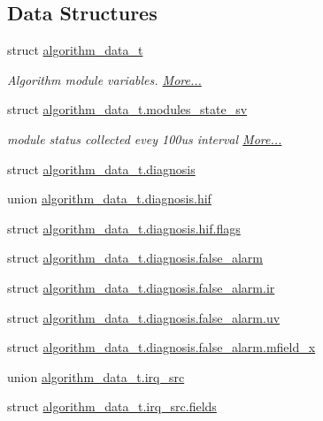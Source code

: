 \subsection*{Data Structures}
\begin{DoxyCompactItemize}
\item 
struct \hyperlink{a00016_d1/d84/a00097}{algorithm\+\_\+data\+\_\+t}
\begin{DoxyCompactList}\small\item\em Algorithm module variables.  \hyperlink{a00016_d1/d84/a00097}{More...}\end{DoxyCompactList}\item 
struct \hyperlink{a00016_df/d98/a00107}{algorithm\+\_\+data\+\_\+t.\+modules\+\_\+state\+\_\+sv}
\begin{DoxyCompactList}\small\item\em module status collected evey 100us interval  \hyperlink{a00016_df/d98/a00107}{More...}\end{DoxyCompactList}\item 
struct \hyperlink{a00016_d1/d44/a00098}{algorithm\+\_\+data\+\_\+t.\+diagnosis}
\item 
union \hyperlink{a00016_d5/d1e/a00103}{algorithm\+\_\+data\+\_\+t.\+diagnosis.\+hif}
\item 
struct \hyperlink{a00016_d0/dc2/a00104}{algorithm\+\_\+data\+\_\+t.\+diagnosis.\+hif.\+flags}
\item 
struct \hyperlink{a00016_da/d74/a00099}{algorithm\+\_\+data\+\_\+t.\+diagnosis.\+false\+\_\+alarm}
\item 
struct \hyperlink{a00016_d0/d61/a00100}{algorithm\+\_\+data\+\_\+t.\+diagnosis.\+false\+\_\+alarm.\+ir}
\item 
struct \hyperlink{a00016_d9/dcc/a00102}{algorithm\+\_\+data\+\_\+t.\+diagnosis.\+false\+\_\+alarm.\+uv}
\item 
struct \hyperlink{a00016_d4/d3a/a00101}{algorithm\+\_\+data\+\_\+t.\+diagnosis.\+false\+\_\+alarm.\+mfield\+\_\+x}
\item 
union \hyperlink{a00016_d3/d32/a00105}{algorithm\+\_\+data\+\_\+t.\+irq\+\_\+src}
\item 
struct \hyperlink{a00016_d7/d70/a00106}{algorithm\+\_\+data\+\_\+t.\+irq\+\_\+src.\+fields}
\end{DoxyCompactItemize}
